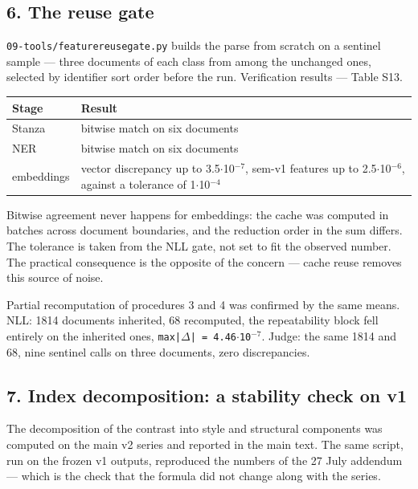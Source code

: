 \documentclass[11pt,a4paper]{article}
\renewcommand{\_}{\textunderscore\allowbreak}
\begin{document}
\subsection{6. The reuse gate}

\texttt{09-\allowbreak{}tools/feature\_reuse\_gate.py} builds the parse from scratch on a sentinel sample — three documents of each class from among the unchanged ones, selected by identifier sort order before the run. Verification results — Table S13.

\begin{center}
\small
\begin{tabularx}{\textwidth}{lX}
\toprule
Stage & Result \\
\midrule
Stanza & bitwise match on six documents \\
NER & bitwise match on six documents \\
embeddings & vector discrepancy up to 3.5$\cdot$10$^{-7}$, sem-v1 features up to 2.5$\cdot$10$^{-6}$, against a tolerance of 1$\cdot$10$^{-4}$ \\
\bottomrule
\end{tabularx}
\end{center}

Bitwise agreement never happens for embeddings: the cache was computed in batches across document boundaries, and the reduction order in the sum differs. The tolerance is taken from the NLL gate, not set to fit the observed number. The practical consequence is the opposite of the concern — cache reuse removes this source of noise.

Partial recomputation of procedures 3 and 4 was confirmed by the same means. NLL: 1814 documents inherited, 68 recomputed, the repeatability block fell entirely on the inherited ones, \texttt{max|$\Delta$| = 4.46$\cdot$10$^{-7}$}. Judge: the same 1814 and 68, nine sentinel calls on three documents, zero discrepancies.

\subsection{7. Index decomposition: a stability check on v1}

The decomposition of the contrast into style and structural components was computed on the main v2 series and reported in the main text. The same script, run on the frozen v1 outputs, reproduced the numbers of the 27 July addendum — which is the check that the formula did not change along with the series.
\end{document}
